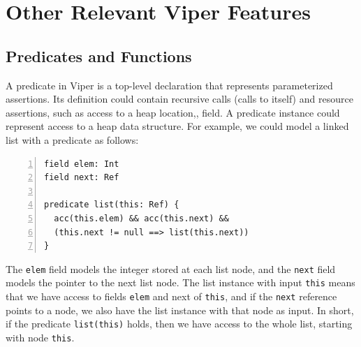 \documentclass[msc,oneside]{ubcthesis}
\theoremstyle{definition}
\begin{document}
\section{Other Relevant Viper Features}



\subsection{Predicates and Functions}

A predicate in Viper is a top-level declaration that represents parameterized assertions. Its definition could contain recursive calls (calls to itself) and resource assertions, such as access to a heap location,\ie, field. A predicate instance could represent access to a heap data structure. For example, we could model a linked list with a predicate as follows:

\begin{lstlisting}[language=silver,numbers=left, firstnumber=1, stepnumber=1]
field elem: Int
field next: Ref

predicate list(this: Ref) {
  acc(this.elem) && acc(this.next) &&
  (this.next != null ==> list(this.next))
}
\end{lstlisting}

The \lstinline|elem| field models the integer stored at each list node, and the \lstinline|next| field models the pointer to the next list node. The list instance with input \lstinline|this| means that we have access to fields \lstinline|elem| and next of \lstinline|this|, and if the \lstinline|next| reference points to a node, we also have the list instance with that node as input. In short, if the predicate \lstinline|list(this)| holds, then we have access to the whole list, starting with node \lstinline|this|. 
\end{document}
